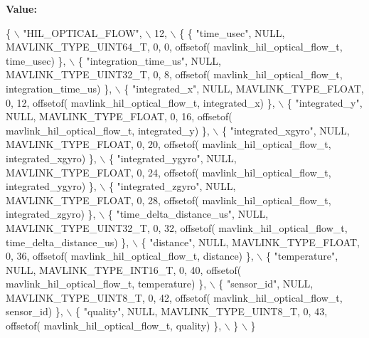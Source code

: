 {\bfseries Value\+:}
\begin{DoxyCode}
\{ \(\backslash\)
    \textcolor{stringliteral}{"HIL\_OPTICAL\_FLOW"}, \(\backslash\)
    12, \(\backslash\)
    \{  \{ \textcolor{stringliteral}{"time\_usec"}, NULL, MAVLINK_TYPE_UINT64_T, 0, 0, offsetof(
      mavlink_hil_optical_flow_t, time\_usec) \}, \(\backslash\)
         \{ \textcolor{stringliteral}{"integration\_time\_us"}, NULL, MAVLINK_TYPE_UINT32_T, 0, 8, offsetof(
      mavlink_hil_optical_flow_t, integration\_time\_us) \}, \(\backslash\)
         \{ \textcolor{stringliteral}{"integrated\_x"}, NULL, MAVLINK_TYPE_FLOAT, 0, 12, offsetof(
      mavlink_hil_optical_flow_t, integrated\_x) \}, \(\backslash\)
         \{ \textcolor{stringliteral}{"integrated\_y"}, NULL, MAVLINK_TYPE_FLOAT, 0, 16, offsetof(
      mavlink_hil_optical_flow_t, integrated\_y) \}, \(\backslash\)
         \{ \textcolor{stringliteral}{"integrated\_xgyro"}, NULL, MAVLINK_TYPE_FLOAT, 0, 20, offsetof(
      mavlink_hil_optical_flow_t, integrated\_xgyro) \}, \(\backslash\)
         \{ \textcolor{stringliteral}{"integrated\_ygyro"}, NULL, MAVLINK_TYPE_FLOAT, 0, 24, offsetof(
      mavlink_hil_optical_flow_t, integrated\_ygyro) \}, \(\backslash\)
         \{ \textcolor{stringliteral}{"integrated\_zgyro"}, NULL, MAVLINK_TYPE_FLOAT, 0, 28, offsetof(
      mavlink_hil_optical_flow_t, integrated\_zgyro) \}, \(\backslash\)
         \{ \textcolor{stringliteral}{"time\_delta\_distance\_us"}, NULL, MAVLINK_TYPE_UINT32_T, 0, 32, offsetof(
      mavlink_hil_optical_flow_t, time\_delta\_distance\_us) \}, \(\backslash\)
         \{ \textcolor{stringliteral}{"distance"}, NULL, MAVLINK_TYPE_FLOAT, 0, 36, offsetof(
      mavlink_hil_optical_flow_t, distance) \}, \(\backslash\)
         \{ \textcolor{stringliteral}{"temperature"}, NULL, MAVLINK_TYPE_INT16_T, 0, 40, offsetof(
      mavlink_hil_optical_flow_t, temperature) \}, \(\backslash\)
         \{ \textcolor{stringliteral}{"sensor\_id"}, NULL, MAVLINK_TYPE_UINT8_T, 0, 42, offsetof(
      mavlink_hil_optical_flow_t, sensor\_id) \}, \(\backslash\)
         \{ \textcolor{stringliteral}{"quality"}, NULL, MAVLINK_TYPE_UINT8_T, 0, 43, offsetof(
      mavlink_hil_optical_flow_t, quality) \}, \(\backslash\)
         \} \(\backslash\)
\}
\end{DoxyCode}
\mbox{\label{mavlink__msg__hil__optical__flow_8h_a95d77783cffe7cbbf577df55639c51bf}} 
